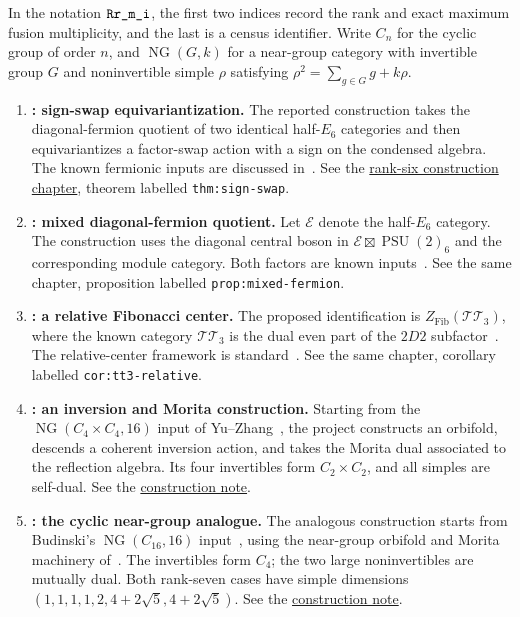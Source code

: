 \documentclass[11pt,a4paper]{article}
\newcommand{\Fib}{\operatorname{Fib}}
\newcommand{\NearGroup}{\operatorname{NG}}
\newcommand{\PSU}{\operatorname{PSU}}
\newcommand{\TT}{\mathcal{TT}}
\newcommand{\caseid}[1]{\texttt{\detokenize{#1}}}
\newcommand{\snap}{https://github.com/sebastienpalcoux/grothendieck-ring-classification/blob/e34396cd95aff1090c10974dd934fe6054ca45eb}
\newcommand{\prooflink}[2]{\href{\snap/#1}{#2}}
\begin{document}
In the notation $\caseid{Rr_m_i}$, the first two indices record the rank
and exact maximum fusion multiplicity, and the last is a census identifier.
Write $C_n$ for the cyclic group of order $n$, and $\NearGroup(G,k)$ for a
near-group category with invertible group $G$ and noninvertible simple
$\rho$ satisfying $\rho^2=\sum_{g\in G}g+k\rho$.

\begin{enumerate}[label=\arabic*.,itemsep=5pt]
\item \textbf{\caseid{R6_4_249}: sign-swap equivariantization.}
The reported construction takes the diagonal-fermion quotient of two
identical half-$E_6$ categories and then equivariantizes a factor-swap
action with a sign on the condensed algebra. The known fermionic inputs
are discussed in~\cite{ALW}. See the
\prooflink{manuscripts/rank6/papers/chapters/06.tex}{rank-six construction chapter},
theorem labelled \texttt{thm:sign-swap}.

\item \textbf{\caseid{R6_4_322}: mixed diagonal-fermion quotient.}
Let $\mathcal E$ denote the half-$E_6$ category. The construction uses
the diagonal central boson in $\mathcal E\boxtimes\PSU(2)_6$ and the
corresponding module category. Both factors are known inputs~\cite{ALW}.
See the same chapter,
proposition labelled \texttt{prop:mixed-fermion}.

\item \textbf{\caseid{R6_6_1712}: a relative Fibonacci center.}
The proposed identification is $Z_{\Fib}(\TT_3)$, where the known category
$\TT_3$ is the dual even part of the $2D2$ subfactor~\cite{EM}.
The relative-center framework is standard~\cite{GNN}.
See the same chapter, corollary labelled \texttt{cor:tt3-relative}.

\item \textbf{\caseid{R7_4_35}: an inversion and Morita construction.}
Starting from the $\NearGroup(C_4\times C_4,16)$ input of Yu--Zhang~\cite{YZ},
the project constructs an orbifold, descends a coherent inversion action,
and takes the Morita dual associated to the reflection algebra.
Its four invertibles form $C_2\times C_2$, and all simples are self-dual.
See the \prooflink{evidence/unified_20261016/rank7/R35_INVERSION_CONSTRUCTION.md}{construction note}.

\item \textbf{\caseid{R7_4_2665}: the cyclic near-group analogue.}
The analogous construction starts from Budinski's
$\NearGroup(C_{16},16)$ input~\cite{Budinski}, using the near-group orbifold
and Morita machinery of~\cite{Izumi}. The invertibles form $C_4$;
the two large noninvertibles are mutually dual. Both rank-seven cases have
simple dimensions $(1,1,1,1,2,4+2\sqrt5,4+2\sqrt5)$.
See the \prooflink{evidence/unified_20261016/rank7/R2665_INVERSION_CONSTRUCTION.md}{construction note}.


\end{enumerate}
\end{document}

